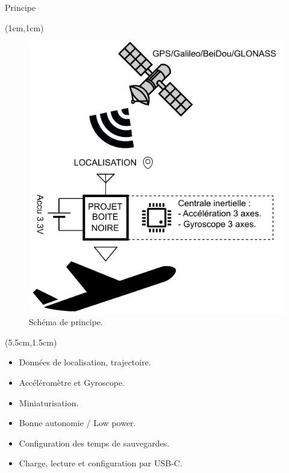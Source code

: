 \documentclass{beamer}
\begin{document}
\begin{frame}{Principe}	
	\begin{textblock*}{4.5cm}(1cm,1cm) %
	\begin{figure}[h]
		\centering
		\includegraphics[width=1\linewidth]{../figures/cdc/schema_principe}
		\caption{Schéma de principe.}
		\label{fig:schemaprincipe}
	\end{figure}
	\end{textblock*}

	\begin{textblock*}{7cm}(5.5cm,1.5cm) 
	\begin{itemize}
		\item Données de localisation, trajectoire.
		\item Accéléromètre et Gyroscope.
		\item Miniaturisation.
		\item Bonne autonomie / Low power.
		\item Configuration des temps de sauvegardes.
		\item Charge, lecture et configuration par USB-C.
	\end{itemize}
	\end{textblock*}
\end{frame}
\end{document}
